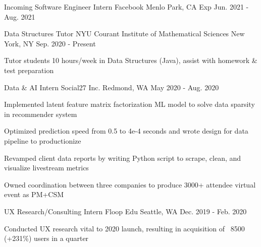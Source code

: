 

\begin{cventries}

  \cventry
    {Incoming Software Engineer Intern} %
    {Facebook} %
    {Menlo Park, CA} %
    {Exp Jun. 2021 - Aug. 2021} %
    {
      \begin{cvitems} %
      \end{cvitems}
    }

    \cventry
    {Data Structures Tutor} %
    {NYU Courant Institute of Mathematical Sciences} %
    {New York, NY} %
    {Sep. 2020 - Present} %
    {
      \begin{cvitems} %
        \item {Tutor students 10 hours/week in Data Structures (Java), assist with homework \& test preparation}
      \end{cvitems}
    }

  \cventry
    {Data \& AI Intern} %
    {Social27 Inc.} %
    {Redmond, WA} %
    {May 2020 - Aug. 2020} %
    {
      \begin{cvitems} %
        \item {Implemented latent feature matrix factorization ML model to solve data sparsity in recommender system}
        \item {Optimized prediction speed from 0.5 to 4e-4 seconds and wrote design for data pipeline to productionize}
        \item {Revamped client data reports by writing Python script to scrape, clean, and visualize livestream metrics}
        \item {Owned coordination between three companies to produce 3000+ attendee virtual event as PM+CSM}
      \end{cvitems}
    }

  \cventry
    {UX Research/Consulting Intern} %
    {Floop Edu} %
    {Seattle, WA} %
    {Dec. 2019 - Feb. 2020} %
    {
      \begin{cvitems} %
        \item {Conducted UX research vital to 2020 launch, resulting in acquisition of ~8500 (+231\%) users in a quarter}
      \end{cvitems}
    }

\end{cventries}